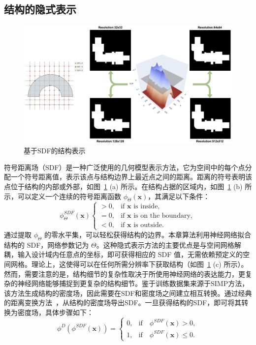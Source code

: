 \subsection{结构的隐式表示}
\begin{figure}[b]
    \centering
    \includegraphics[width=1.0\textwidth]{./figures/TONIR/2-SDF.png}
    \caption{基于SDF的结构表示}
    \label{fig:SDF}
\end{figure}
符号距离场（SDF）是一种广泛使用的几何模型表示方法，它为空间中的每个点分配一个符号距离值，表示该点与结构边界上最近点之间的距离。距离的符号表明该点位于结构的内部或外部，如图~\ref{fig:SDF} (a) 所示。在结构占据的区域内，如图~\ref{fig:SDF} (b) 所示，可以定义一个连续的符号距离函数 $\phi_\Theta(\textbf{x})$，其满足以下条件：
\begin{equation}
    \phi^{SDF}_\Theta(\mathbf{x})
    \begin{cases}
        >0, & \text{if $\mathbf{x}$ is inside},          \\
        =0, & \text{if $\mathbf{x}$ is on the boundary}, \\
        <0, & \text{if $\mathbf{x}$ is outside}.
    \end{cases}
\end{equation}
通过提取 $\phi_\Theta$ 的零水平集，可以轻松获得结构的边界。本章算法利用神经网络拟合结构的 SDF，网络参数记为 $\Theta$。这种隐式表示方法的主要优点是与空间网格解耦，输入设计域内任意点的坐标，即可获得相应的 SDF 值，无需依赖预定义的空间网格。理论上，这使得可以在任何所需分辨率下获取结构（如图~\ref{fig:SDF} (c) 所示）。然而，需要注意的是，结构细节的复杂性取决于所使用神经网络的表达能力，更复杂的神经网络能够捕捉到更复杂的结构细节。鉴于训练数据集来源于SIMP方法，该方法生成结构的密度场，因此需要在SDF和密度场之间建立相互转换。通过经典的距离变换方法~\cite{maurer2003linear}，从结构的密度场导出SDF。一旦获得结构的SDF，即可将其转换为密度场，具体步骤如下：
\begin{equation}
    \phi^{D}(\phi^{SDF}(\mathbf{x}))=
    \begin{cases}
        0, & \text{if}\quad \phi^{SDF}(\mathbf{x}) > 0,\\
        1, & \text{if}\quad \phi^{SDF}(\mathbf{x})\leq 0.
    \end{cases}
\end{equation}



